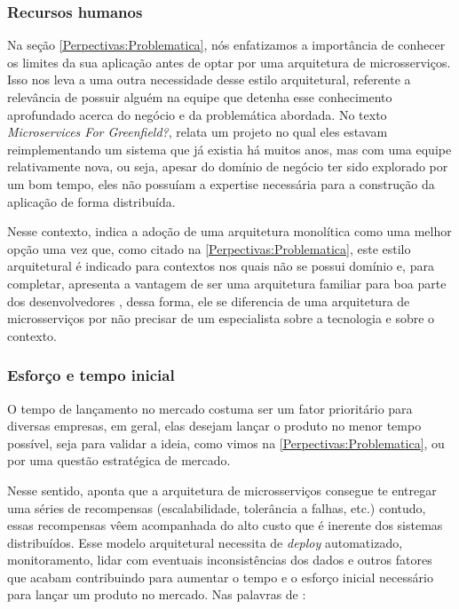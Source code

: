 \subsubsection{Recursos humanos}

Na seção \autoref{Perpectivas:Problematica}, nós enfatizamos a importância de conhecer os limites da
sua aplicação antes de optar por uma arquitetura de microsserviços. Isso nos leva a uma outra necessidade desse
estilo arquitetural, referente a relevância de possuir alguém na equipe que detenha esse conhecimento
aprofundado acerca do negócio e da problemática abordada. No texto \textit{Microservices For
Greenfield?},  relata um projeto no qual eles estavam reimplementando
um sistema que já existia há muitos anos, mas com uma equipe relativamente nova, ou seja, apesar do
domínio de negócio ter sido explorado por um bom tempo, eles não possuíam a expertise necessária
para a construção da aplicação de forma distribuída.

Nesse contexto,  indica a adoção de uma arquitetura monolítica como uma
melhor opção uma vez que, como citado na \autoref{Perpectivas:Problematica}, este estilo arquitetural
é indicado para contextos nos quais não se possui domínio e, para completar, apresenta a vantagem de ser uma
arquitetura familiar para boa parte dos desenvolvedores
\cite{Richards2020:FundamentalsOfSoftwareArchitecture}, dessa forma, ele se diferencia de uma
arquitetura de microsserviços por não precisar de um especialista sobre a tecnologia e sobre o contexto.


\subsubsection{Esforço e tempo inicial}
\label{effortsAndTime}

O tempo de lançamento no mercado costuma ser um fator prioritário para diversas empresas, em geral,
elas desejam lançar o produto no menor tempo possível, seja para validar a ideia, como
vimos na \autoref{Perpectivas:Problematica}, ou por uma questão estratégica de mercado.

Nesse sentido,  aponta que a arquitetura de
microsserviços consegue te entregar uma séries de recompensas (escalabilidade, tolerância a falhas,
etc.) contudo, essas recompensas vêem acompanhada do alto custo que é inerente dos sistemas distribuídos.
Esse modelo arquitetural necessita de \textit{deploy} automatizado, monitoramento, lidar com
eventuais inconsistências dos dados e outros fatores que acabam contribuindo para aumentar o tempo e o esforço
inicial necessário para lançar um produto no mercado. Nas palavras de
:

